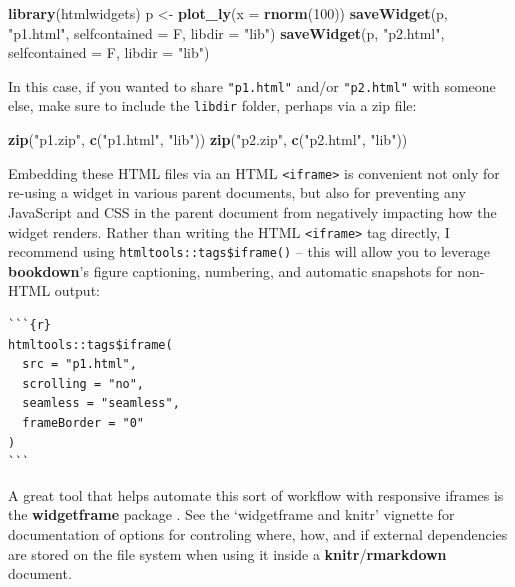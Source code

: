 \documentclass[
  12pt,
]{krantz}
\newenvironment{Shaded}{\begin{snugshade}}{\end{snugshade}}
\newcommand{\DataTypeTok}[1]{\textcolor[rgb]{0.13,0.29,0.53}{#1}}
\newcommand{\DecValTok}[1]{\textcolor[rgb]{0.00,0.00,0.81}{#1}}
\newcommand{\KeywordTok}[1]{\textcolor[rgb]{0.13,0.29,0.53}{\textbf{#1}}}
\newcommand{\NormalTok}[1]{#1}
\newcommand{\StringTok}[1]{\textcolor[rgb]{0.31,0.60,0.02}{#1}}
\begin{document}
\begin{Shaded}
\begin{Highlighting}[]
\KeywordTok{library}\NormalTok{(htmlwidgets)}
\NormalTok{p <-}\StringTok{ }\KeywordTok{plot_ly}\NormalTok{(}\DataTypeTok{x =} \KeywordTok{rnorm}\NormalTok{(}\DecValTok{100}\NormalTok{))}
\KeywordTok{saveWidget}\NormalTok{(p, }\StringTok{"p1.html"}\NormalTok{, }\DataTypeTok{selfcontained =}\NormalTok{ F, }\DataTypeTok{libdir =} \StringTok{"lib"}\NormalTok{)}
\KeywordTok{saveWidget}\NormalTok{(p, }\StringTok{"p2.html"}\NormalTok{, }\DataTypeTok{selfcontained =}\NormalTok{ F, }\DataTypeTok{libdir =} \StringTok{"lib"}\NormalTok{)}
\end{Highlighting}
\end{Shaded}

In this case, if you wanted to share \texttt{"p1.html"} and/or \texttt{"p2.html"} with someone else, make sure to include the \texttt{libdir} folder, perhaps via a zip file:

\begin{Shaded}
\begin{Highlighting}[]
\KeywordTok{zip}\NormalTok{(}\StringTok{"p1.zip"}\NormalTok{, }\KeywordTok{c}\NormalTok{(}\StringTok{"p1.html"}\NormalTok{, }\StringTok{"lib"}\NormalTok{))}
\KeywordTok{zip}\NormalTok{(}\StringTok{"p2.zip"}\NormalTok{, }\KeywordTok{c}\NormalTok{(}\StringTok{"p2.html"}\NormalTok{, }\StringTok{"lib"}\NormalTok{))}
\end{Highlighting}
\end{Shaded}

Embedding these HTML files via an HTML \texttt{\textless{}iframe\textgreater{}} is convenient not only for re-using a widget in various parent documents, but also for preventing any JavaScript and CSS in the parent document from negatively impacting how the widget renders. Rather than writing the HTML \texttt{\textless{}iframe\textgreater{}} tag directly, I recommend using \texttt{htmltools::tags\$iframe()} -- this will allow you to leverage \textbf{bookdown}'s figure captioning, numbering, and automatic snapshots for non-HTML output:

\begin{verbatim}
```{r}
htmltools::tags$iframe(
  src = "p1.html", 
  scrolling = "no", 
  seamless = "seamless",
  frameBorder = "0"
)
```
\end{verbatim}

A great tool that helps automate this sort of workflow with responsive iframes is the \textbf{widgetframe} package \citep{widgetframe}. See the `widgetframe and knitr' vignette for documentation of options for controling where, how, and if external dependencies are stored on the file system when using it inside a \textbf{knitr}/\textbf{rmarkdown} document.
\end{document}
